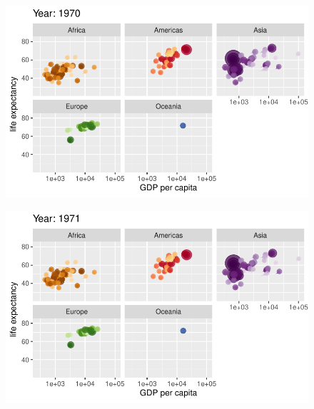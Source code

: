 \documentclass[
  letterpaper,
  DIV=11,
  numbers=noendperiod]{scrartcl}
\begin{document}
\begin{figure}[H]

{\centering \includegraphics{class05_files/figure-pdf/unnamed-chunk-24-34.pdf}

}

\end{figure}

\begin{figure}[H]

{\centering \includegraphics{class05_files/figure-pdf/unnamed-chunk-24-35.pdf}

}

\end{figure}
\end{document}
